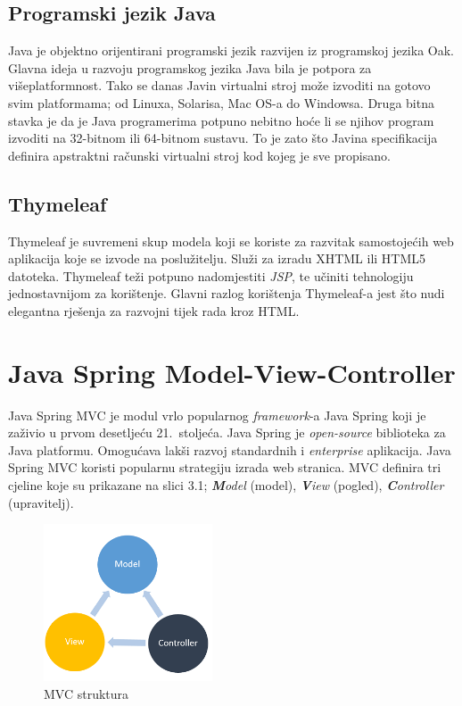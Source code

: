 \documentclass[times, utf8, zavrsni, numeric]{fer}
\begin{document}
\subsection{Programski jezik Java}
\qquad Java je objektno orijentirani programski jezik razvijen iz programskoj jezika Oak\footnotemark{}.
Glavna ideja u razvoju programskog jezika Java bila je potpora za višeplatformnost.
Tako se danas Javin virtualni stroj može izvoditi na gotovo svim platformama; od Linuxa, Solarisa, Mac OS-a do Windowsa.
Druga bitna stavka je da je Java programerima potpuno nebitno hoće li se njihov program izvoditi na 32-bitnom ili 64-bitnom sustavu.
To je zato što Javina specifikacija definira apstraktni računski virtualni stroj kod kojeg je sve propisano.
\subsection{Thymeleaf}
\qquad Thymeleaf je suvremeni skup modela koji se koriste za razvitak samostojećih web aplikacija koje se izvode na poslužitelju.
Služi za izradu XHTML ili HTML5 datoteka.
Thymeleaf teži potpuno nadomjestiti \textit{JSP}\footnotemark{}, te učiniti tehnologiju jednostavnijom za korištenje.
Glavni razlog korištenja Thymeleaf-a jest što nudi elegantna rješenja za razvojni tijek rada kroz HTML.

\section{Java Spring Model-View-Controller}
\qquad Java Spring MVC je modul vrlo popularnog \textit{framework}-a Java Spring koji je zaživio u prvom desetljeću 21.~stoljeća.
Java Spring je \textit{open-source} biblioteka za Java platformu.
Omogućava lakši razvoj standardnih i \textit{enterprise}\footnotemark{} aplikacija.
Java Spring MVC koristi popularnu strategiju izrada web stranica.
MVC definira tri cjeline koje su prikazane na slici 3.1; \textit{\textbf{M}odel} (model), \textit{\textbf{V}iew} (pogled), \textit{\textbf{C}ontroller} (upravitelj).

\begin{figure}[htb]
				\centering
				\includegraphics[width=5cm]{images/mvc.png}
				\caption{MVC struktura}
				\label{fig:mvc}
\end{figure}
\end{document}
